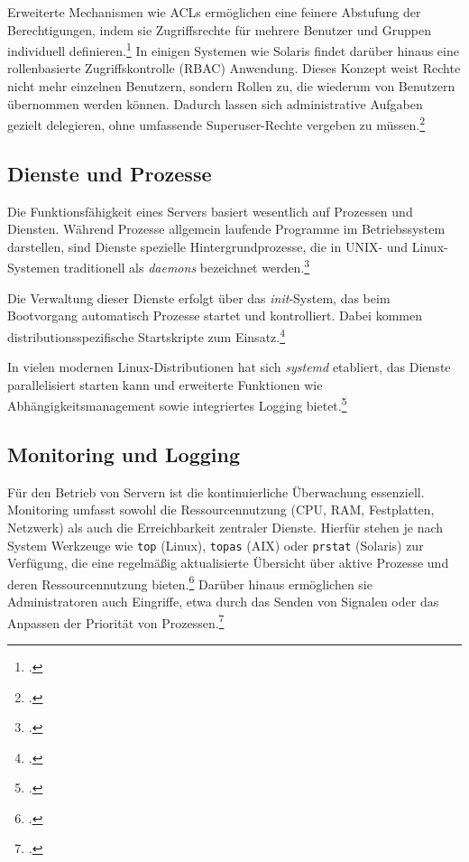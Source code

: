 \documentclass[12pt,a4paper]{report}
\begin{document}
  Erweiterte Mechanismen wie \ac{ACL}s ermöglichen eine feinere Abstufung der Berechtigungen, 
  indem sie Zugriffsrechte für mehrere Benutzer und Gruppen individuell definieren.\footcite[Vgl.][S.~159~ff.]{nemeth_unixlinux} 
  In einigen Systemen wie Solaris findet darüber hinaus eine rollenbasierte Zugriffskontrolle (\ac{RBAC}) Anwendung. 
  Dieses Konzept weist Rechte nicht mehr einzelnen Benutzern, sondern Rollen zu, die wiederum von Benutzern übernommen werden können. 
  Dadurch lassen sich administrative Aufgaben gezielt delegieren, ohne umfassende Superuser-Rechte vergeben zu müssen.\footcite[Vgl.][S.~108]{nemeth_unixlinux}

  \subsection{Dienste und Prozesse}
  Die Funktionsfähigkeit eines Servers basiert wesentlich auf Prozessen und Diensten. 
  Während Prozesse allgemein laufende Programme im Betriebssystem darstellen, 
  sind Dienste spezielle Hintergrundprozesse, die in UNIX- und Linux-Systemen 
  traditionell als \emph{daemons} bezeichnet werden.\footcite[Vgl.]{wikipedia_daemon}  

  Die Verwaltung dieser Dienste erfolgt über das \emph{init}-System, 
  das beim Bootvorgang automatisch Prozesse startet und kontrolliert. 
  Dabei kommen distributionsspezifische Startskripte zum Einsatz.\footcite[Vgl.][S.~88~ff.]{nemeth_unixlinux}  

  In vielen modernen Linux-Distributionen hat sich \emph{systemd} etabliert, 
  das Dienste parallelisiert starten kann und erweiterte Funktionen wie Abhängigkeitsmanagement 
  sowie integriertes Logging bietet.\footcite[Vgl.]{wikipedia_systemd}   

  \subsection{Monitoring und Logging}
  Für den Betrieb von Servern ist die kontinuierliche Überwachung essenziell. 
  Monitoring umfasst sowohl die Ressourcennutzung (\ac{CPU}, \ac{RAM}, Festplatten, Netzwerk) als auch die Erreichbarkeit zentraler Dienste. 
  Hierfür stehen je nach System Werkzeuge wie \texttt{top} (Linux), \texttt{topas} (AIX) oder \texttt{prstat} (Solaris) zur Verfügung, 
  die eine regelmäßig aktualisierte Übersicht über aktive Prozesse und deren Ressourcennutzung bieten.\footcite[Vgl.][S.~133]{nemeth_unixlinux}
  Darüber hinaus ermöglichen sie Administratoren auch Eingriffe, 
  etwa durch das Senden von Signalen oder das Anpassen der Priorität von Prozessen.\footcite[Vgl.][S.~134]{nemeth_unixlinux}
\end{document}
